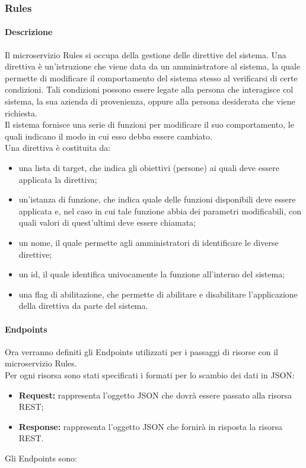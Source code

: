 \subsubsection{Rules}
\paragraph{Descrizione}
Il microservizio Rules si occupa della gestione delle direttive del sistema. Una direttiva è un'istruzione che viene data da un amministratore al sistema, la quale permette di modificare il comportamento del sistema stesso al verificarsi di certe condizioni. Tali condizioni possono essere legate alla persona che interagisce col sistema, la sua azienda di provenienza, oppure alla persona desiderata che viene richiesta.\\
Il sistema fornisce una serie di funzioni per modificare il suo comportamento, le quali indicano il modo in cui esso debba essere cambiato. \\
Una direttiva è costituita da:
\begin{itemize}
	\item una lista di target, che indica gli obiettivi (persone) ai quali deve essere applicata la direttiva;
	\item un'istanza di funzione, che indica quale delle funzioni disponibili deve essere applicata e, nel caso in cui tale funzione abbia dei parametri modificabili, con quali valori di quest'ultimi deve essere chiamata;
	\item un nome, il quale permette agli amministratori di identificare le diverse direttive;
	\item un id, il quale identifica univocamente la funzione all'interno del sistema;
	\item una flag di abilitazione, che permette di abilitare e disabilitare l'applicazione della direttiva da parte del sistema.
\end{itemize}

\paragraph{Endpoints}

Ora verranno definiti gli Endpoints utilizzati per i passaggi di risorse con il microservizio Rules.\\
Per ogni risorsa sono stati specificati i formati per lo scambio dei dati in JSON:
\begin{itemize}
\item \textbf{Request:} rappresenta l’oggetto JSON che dovrà essere passato alla risorsa REST;
\item \textbf{Response:} rappresenta l’oggetto JSON che fornirà in risposta la risorsa REST.
\end{itemize}
Gli Endpoints sono:


